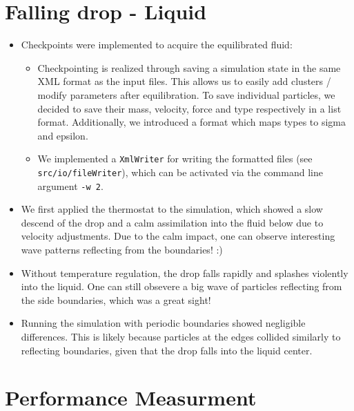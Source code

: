 \documentclass{article}
\begin{document}
\section{Falling drop - Liquid}
\label{sec:drop}

    \begin{itemize}
        \item Checkpoints were implemented to acquire the equilibrated fluid:
        \begin{itemize}
            \item Checkpointing is realized through saving a simulation state in the same XML format as the input files. This allows us to easily add clusters / modify parameters after equilibration. To save individual particles, we decided to save their mass, velocity, force and type respectively in a list format. Additionally, we introduced a format which maps types to sigma and epsilon.
            \item We implemented a \texttt{XmlWriter} for writing the formatted files (see \texttt{src/io/fileWriter}), which can be activated via the command line argument \texttt{-w 2}.
        \end{itemize}
    \item We first applied the thermostat to the simulation, which showed a slow descend of the drop and a calm assimilation into the fluid below due to velocity adjustments. Due to the calm impact, one can observe interesting wave patterns reflecting from the boundaries! :)
        \item Without temperature regulation, the drop falls rapidly and splashes violently into the liquid. One can still obsevere a big wave of particles reflecting from the side boundaries, which was a great sight!
        \item Running the simulation with periodic boundaries showed negligible differences. This is likely because particles at the edges collided similarly to reflecting boundaries, given that the drop falls into the liquid center.    \end{itemize}


\section{Performance Measurment}
\label{sec:perf}
    
\end{document}
